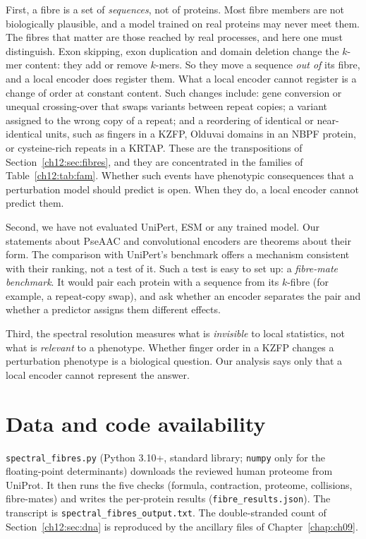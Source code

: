 First, a fibre is a set of \emph{sequences}, not of proteins. Most fibre members are not
biologically plausible, and a model trained on real proteins may never meet them. The fibres that
matter are those reached by real processes, and here one must distinguish. Exon skipping, exon
duplication and domain deletion change the $k$-mer content: they add or remove $k$-mers. So they
move a sequence \emph{out of} its fibre, and a local encoder does register them. What a local encoder
cannot register is a change of order at constant content. Such changes include: gene conversion or
unequal crossing-over that swaps variants between repeat copies; a variant assigned to the wrong copy
of a repeat; and a reordering of identical or near-identical units, such as fingers in a KZFP, Olduvai
domains in an NBPF protein, or cysteine-rich repeats in a KRTAP. These are the transpositions of
Section~\ref{ch12:sec:fibres}, and they are concentrated in the families of Table~\ref{ch12:tab:fam}. Whether
such events have phenotypic consequences that a perturbation model should predict is open. When they
do, a local encoder cannot predict them.

Second, we have not evaluated UniPert, ESM or any trained model. Our statements about PseAAC and
convolutional encoders are theorems about their form. The comparison with UniPert's benchmark offers
a mechanism consistent with their ranking, not a test of it. Such a test is easy to set up: a
\emph{fibre-mate benchmark}. It would pair each protein with a sequence from its $k$-fibre (for
example, a repeat-copy swap), and ask whether an encoder separates the pair and whether a predictor
assigns them different effects.

Third, the spectral resolution measures what is \emph{invisible} to local statistics, not what is
\emph{relevant} to a phenotype. Whether finger order in a KZFP changes a perturbation phenotype is a
biological question. Our analysis says only that a local encoder cannot represent the answer.

\section*{Data and code availability}
\texttt{spectral\_fibres.py} (Python 3.10+, standard library; \texttt{numpy} only for the
floating-point determinants) downloads the reviewed human proteome from UniProt. It then runs the
five checks (formula, contraction, proteome, collisions, fibre-mates) and writes the per-protein
results (\texttt{fibre\_results.json}). The transcript is \texttt{spectral\_fibres\_output.txt}. The
double-stranded count of Section~\ref{ch12:sec:dna} is reproduced by the ancillary files of Chapter~\ref{chap:ch09}.
